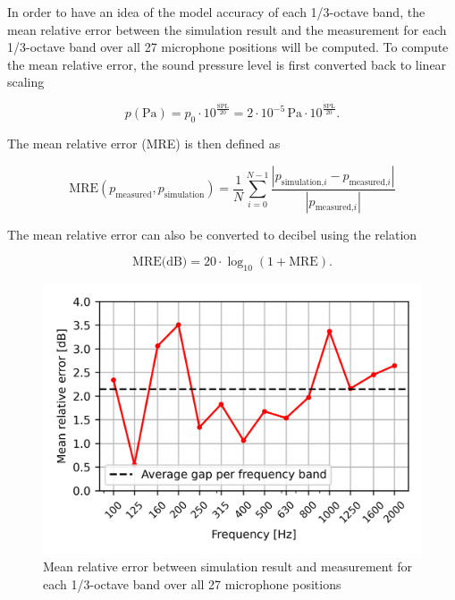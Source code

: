 In order to have an idea of the model accuracy of each 1/3-octave band, the mean relative error between the simulation result and the measurement for each 1/3-octave band over all 27 microphone positions will be computed. To compute the mean relative error, the sound pressure level is first converted back to linear scaling

\begin{equation}
	p(\text{Pa}) = p_0 \cdot 10^{\frac{\text{SPL}}{20}} = 2\cdot10^{-5}\,\text{Pa} \cdot 10^{\frac{\text{SPL}}{20}}\text{.}
\end{equation}

The mean relative error (MRE) is then defined as

\begin{equation}
	\text{MRE}(p_{\text{measured}}, p_{\text{simulation}}) = \frac{1}{N} \sum_{i=0}^{N - 1} \frac{|p_{\text{simulation,}i} - p_{\text{measured,}i}|}{|p_{\text{measured,}i}|}
\end{equation}

The mean relative error can also be converted to decibel using the relation

\begin{equation}
	\text{MRE(dB)} = 20\cdot\log_{10}(1 + \text{MRE})\text{.}
\end{equation}

\begin{figure}[H]
	\centering
	\includegraphics{fig/chap5/initial_model/freq_spectrum/average_gap.png}
	\caption{Mean relative error between simulation result and measurement for each 1/3-octave band over all 27 microphone positions}
	\label{fig:gap_freq_spectrum}
\end{figure}

